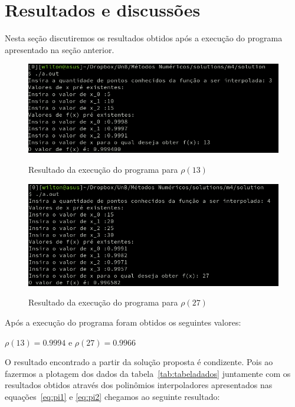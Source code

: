 \documentclass[12pt, hidelinks]{article}
\begin{document}


\newpage
\section{Resultados e discussões}

Nesta seção discutiremos os resultados obtidos após a execução do programa apresentado na seção anterior.

\begin{figure}[!h]
  \centering
  \includegraphics[width=15cm]{figuras/p13.png}\\
  \caption{Resultado da execução do programa para $\rho(13)$}\label{fig:printro13}
\end{figure}
\begin{figure}[!h]
  \centering
  \includegraphics[width=15cm]{figuras/p27.png}\\
  \caption{Resultado da execução do programa para $\rho(27)$}\label{fig:printro27}
\end{figure}
Após a execução do programa foram obtidos os seguintes valores:
\begin{center}
  $\rho(13) = 0.9994$ e $\rho(27) = 0.9966$
\end{center}

O resultado encontrado a partir da solução proposta é condizente. Pois ao fazermos a plotagem dos dados da tabela~\eqref{tab:tabeladados} juntamente com os resultados obtidos através dos polinômios interpoladores apresentados nas equações~\eqref{eq:pi1} e \eqref{eq:pi2} chegamos ao seguinte resultado:
\end{document}
